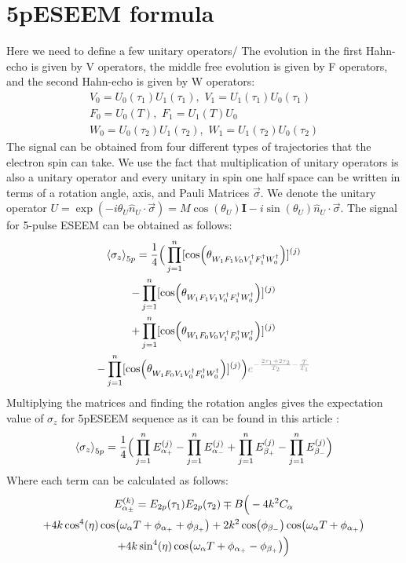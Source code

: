 \documentclass[%
 reprint,
superscriptaddress,
 amsmath,amssymb,
 aps,
]{revtex4-2}
\begin{document}
\section{5pESEEM formula}
\label{app:5pESEEM} 
Here we need to define a few unitary operators/ The evolution in the first Hahn-echo is given by V operators, the middle free evolution is given by F operators, and the second Hahn-echo is given by W operators:
\begin{gather}
	V_0 = U_0 (\tau_1) U_1 (\tau_1),\,\,  V_1 = U_1 (\tau_1) U_0 (\tau_1) \\
	F_0 = U_0 (T), \,\, F_1 = U_1 (T) U_0 \\
	W_0 = U_0 (\tau_2) U_1 (\tau_2), \,\, W_1 = U_1 (\tau_2) U_0 (\tau_2)
\end{gather}
The signal can be obtained from four different types of trajectories that the electron spin can take. We use the fact that multiplication of unitary operators is also a unitary operator and every unitary in spin one half space can be written in terms of a rotation angle, axis, and Pauli Matrices $\vec{\sigma}$. We denote the unitary operator $U = \exp(-i \theta_U \hat{n}_U\cdot\vec{\sigma}) = M\cos(\theta_U) \mathbf{I}- i \sin(\theta_U) \hat{n}_U\cdot\vec{\sigma}$. The signal for 5-pulse ESEEM can be obtained as follows:
\begin{gather}
		\expval{\sigma_z}_{5p} =\frac{1}{4}\Big( \prod_{j=1}^n [\cos(\theta_{W_1 F_1 V_0 V_1^\dagger F_1^\dagger W_0^\dagger})]^{(j)}  \notag \\
		-\prod_{j=1}^n [\cos(\theta_{W_1 F_1 V_1 V_0^\dagger F_1^\dagger W_0^\dagger})]^{(j)}  \notag \\
		+ \prod_{j=1}^n [\cos(\theta_{W_1 F_0 V_0 V_1^\dagger F_0^\dagger W_0^\dagger})]^{(j)}  \notag \\
		-\prod_{j=1}^n [\cos(\theta_{W_1 F_0 V_1 V_0^\dagger F_0^\dagger W_0^\dagger})]^{(j)} \Big) \textcolor{gray}{e^{-\frac{2\tau_1+2\tau_2}{T_2}- \frac{T}{T_1}}}
\end{gather}
Multiplying the matrices and finding the rotation angles gives the expectation value of $\sigma_z$ for 5pESEEM sequence as it can be found in this article \cite{kasumaj20085}:
\begin{gather}
	\expval{\sigma_z}_{5p} = \frac{1}{4}\Big( \prod_{j=1}^n E_{\alpha_+}^{(j)} - \prod_{j=1}^n E_{\alpha_-}^{(j)} + \prod_{j=1}^n E_{\beta_+}^{(j)}- \prod_{j=1}^n E_{\beta_-}^{(j)}\Big)
\end{gather}
Where each term can be calculated as follows:
\small   
\begin{gather} 
	E_{\alpha_\pm}^{(k)} = E_{2p}(\tau_1) E_{2p}(\tau_2) \mp B \Big(-4k^2C_\alpha \notag \\
	+4k\cos^4(\eta) \cos(\omega_\alpha T + \phi_{\alpha_+} +\phi_{\beta_+}) 
	+2 k^2 \cos(\phi_{\beta_-}) \cos(\omega_\alpha T+\phi_{\alpha_+}) \notag \\
	+ 4k \sin^4(\eta) \cos(\omega_\alpha T +\phi_{\alpha_+} -\phi_{\beta_+} )\Big)
	\label{eq:eseem}
\end{gather}
\end{document}
